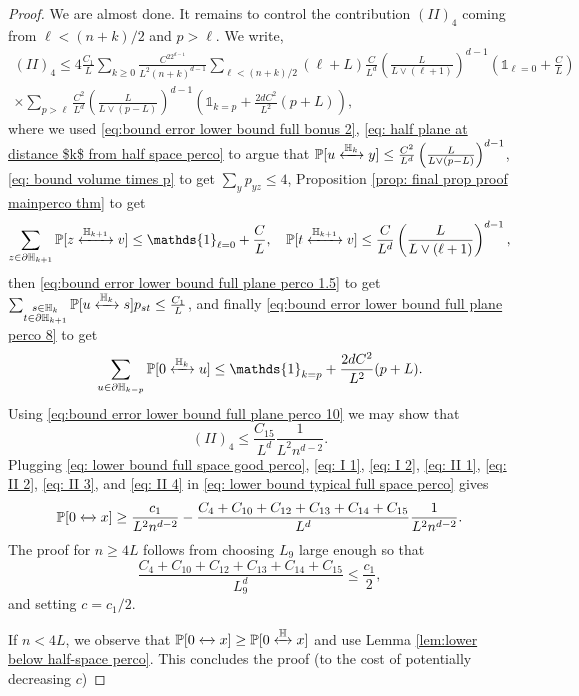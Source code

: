 \documentclass[11pt,a4paper]{article}
\numberwithin{equation}{section}
\theoremstyle{plain}
\theoremstyle{definition}
\newcommand{\connect}{\xleftrightarrow}
\begin{document}
\begin{proof}
We are almost done. It remains to control the contribution $(II)_4$ coming from $\ell <(n+k)/2$ and $p>\ell$. We write,
\begin{multline}\label{eq:bound error lower bound full plane perco 10}
	(II)_4\leq 4\frac{C_1}{L}\sum_{k\geq 0}\frac{C^22^{d-1}}{L^2(n+k)^{d-1}}\sum_{\ell <(n+k)/2}(\ell+L)\frac{C}{L^d}\left(\frac{L}{L\vee (\ell+1)}\right)^{d-1}\left(\mathds{1}_{\ell=0}+\frac{C}{L}\right)\\\times\sum_{p>\ell}\frac{C^2}{L^d}\left(\frac{L}{L\vee (p-L)}\right)^{d-1}\left(\mathds{1}_{k=p}+\frac{2dC^2}{L^2}(p+L)\right),
\end{multline}
where we used \eqref{eq:bound error lower bound full bonus 2}, \eqref{eq: half plane at distance $k$ from half space perco} to argue that $\mathbb P[u\connect{\mathbb H_k\:}y]\leq\frac{C^2}{L^d}\left(\frac{L}{L\vee (p-L)}\right)^{d-1}$, \eqref{eq: bound volume times p} to get $\sum_{y}p_{yz}\leq 4$, Proposition \ref{prop: final prop proof mainperco thm} to get 
\begin{equation}
	\sum_{z\in \partial\mathbb H_{k+1}}\mathbb P[z\connect{\mathbb H_{k+1}\:}v]\leq \mathds{1}_{\ell=0}+\frac{C}{L},\quad \mathbb P[t\connect{\mathbb H_{k+1}\:}v]\leq \frac{C}{L^d}\left(\frac{L}{L\vee (\ell+1)}\right)^{d-1},
\end{equation}
then \eqref{eq:bound error lower bound full plane perco 1.5} to get $\sum_{\substack{s\in \mathbb H_k\\t\in \partial\mathbb H_{k+1}}}\mathbb P[u\connect{\mathbb H_k\:}s]p_{st}\leq \frac{C_1}{L}$, and finally \eqref{eq:bound error lower bound full plane perco 8} to get
\begin{equation}
\sum_{u\in \partial\mathbb H_{k-p}}\mathbb P[0\connect{\mathbb H_k\:}u]\leq \mathds{1}_{k=p}+\frac{2dC^2}{L^2}(p+L).\end{equation} Using \eqref{eq:bound error lower bound full plane perco 10} we may show that
\begin{equation}\label{eq: II 4}
 (II)_4\leq \frac{C_{15}}{L^d}\frac{1}{L^2n^{d-2}}.
\end{equation}
Plugging \eqref{eq: lower bound full space good perco}, \eqref{eq: I 1}, \eqref{eq: I 2}, \eqref{eq: II 1}, \eqref{eq: II 2}, \eqref{eq: II 3}, and \eqref{eq: II 4} in \eqref{eq: lower bound typical full space perco} gives
\begin{equation}
	\mathbb P[0\connect{}x]\geq \frac{c_1}{L^2n^{d-2}}-\frac{C_4+C_{10}+C_{12}+C_{13}+C_{14}+C_{15}}{L^d}\frac{1}{L^2n^{d-2}}.
\end{equation}
The proof for $n\geq 4L$ follows from choosing $L_9$ large enough so that 
\begin{equation}
\frac{C_4+C_{10}+C_{12}+C_{13}+C_{14}+C_{15}}{L_9^d}\leq \frac{c_1}{2},
\end{equation}
and setting $c=c_1/2$.

If $n<4L$, we observe that $\mathbb P[0\connect{}x]\geq \mathbb P[0\connect{\mathbb H\:}x]$ and use Lemma \ref{lem:lower below half-space perco}. This concludes the proof (to the cost of potentially decreasing $c$)
\end{proof}
\end{document}
